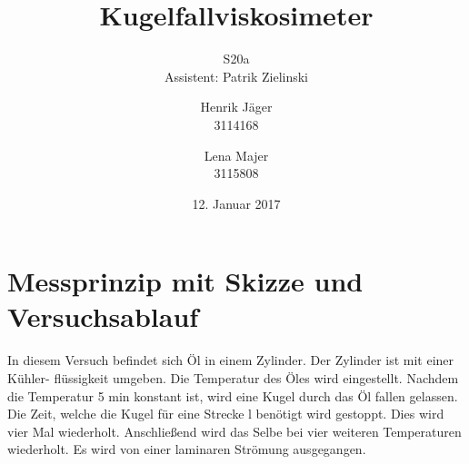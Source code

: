 \documentclass[12pt,a4paper,]{scrreprt}
\begin{document}
\title{Kugelfallviskosimeter}
\author{Henrik Jäger \\ 3114168 \and Lena Majer \\ 3115808}
\subtitle{S20a \\  Assistent: Patrik Zielinski}
\subject{Physikalisches Praktikum I}
\publishers{Universität Stuttgart}
\date{12. Januar 2017}

\maketitle%

\tableofcontents   %
\pagebreak


\chapter{Messprinzip mit Skizze und Versuchsablauf}
In diesem Versuch befindet sich Öl in einem Zylinder. Der Zylinder ist mit einer Kühler- flüssigkeit umgeben. Die Temperatur des Öles wird eingestellt. Nachdem die Temperatur 5 min konstant ist, wird eine Kugel durch das Öl fallen gelassen. Die Zeit, welche die Kugel für eine Strecke l benötigt wird gestoppt. Dies wird vier Mal wiederholt. Anschließend wird das Selbe bei vier weiteren Temperaturen wiederholt. Es wird von einer laminaren Strömung ausgegangen.
\end{document}
